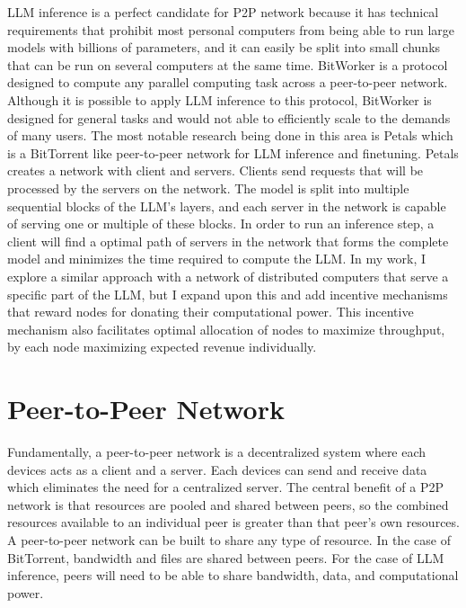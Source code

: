 \documentclass[preprint,twoside,11pt]{article}
\begin{document}
LLM inference is a perfect candidate for P2P network because it has technical requirements that prohibit most personal computers from being able to run
large models with billions of parameters, and it can easily be split into small chunks that can be run on several computers at the same time. BitWorker \citep{Durand_Gasparyan_Rouvinez_Aad_Braun_Trinh_2015} is a protocol designed to compute any parallel computing task across a peer-to-peer network.
Although it is possible to apply LLM inference to this protocol, BitWorker is designed for general tasks and would not able to efficiently scale to the demands of many users.
The most notable research being done in this area is Petals \citep{borzunov2023petalscollaborativeinferencefinetuning} which is a BitTorrent like peer-to-peer network for LLM inference and finetuning.
Petals creates a network with client and servers. Clients send requests that will be processed by the servers on the network. The model is split into multiple sequential blocks of the LLM's layers, and each server
in the network is capable of serving one or multiple of these blocks. In order to run an inference step, a client will find a optimal path of servers
in the network that forms the complete model and minimizes the time required to compute the LLM. In my work, I explore a similar approach with a network of distributed computers that serve a specific part of the LLM,
but I expand upon this and add incentive mechanisms that reward nodes for donating their computational power. This incentive mechanism also facilitates optimal allocation of nodes to maximize throughput, by each
node maximizing expected revenue individually.

\section{Peer-to-Peer Network}

Fundamentally, a peer-to-peer network is a decentralized system where each devices acts as a client and a server.
Each devices can send and receive data which eliminates the need for a centralized server. The central benefit of a P2P network
is that resources are pooled and shared between peers, so the combined resources available to an individual peer is greater than that peer's own resources.
A peer-to-peer network can be built to share any type of resource. In the case of BitTorrent, bandwidth and files are shared between peers.
For the case of LLM inference, peers will need to be able to share bandwidth, data, and computational power.
\end{document}

